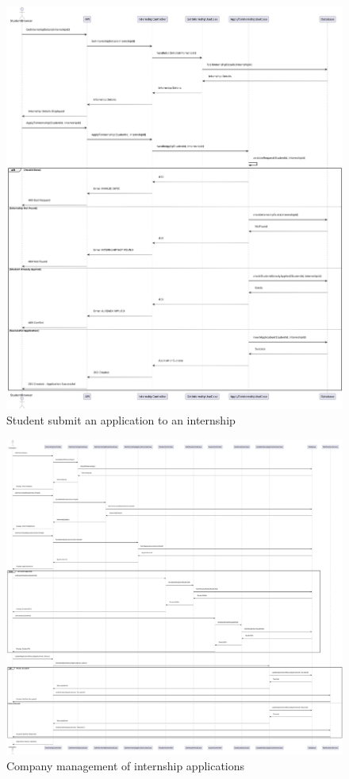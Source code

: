 \newpage

\begin{figure}[ht!]
    \centering
    \includegraphics[scale=0.28]{Images/ImagesSequenceDiagram/StudentSubmitApplication.png}
    \caption{Student submit an application to an internship}
\end{figure}

\newpage

\begin{figure}[ht!]
    \centering
    \includegraphics[scale=0.15]{Images/ImagesSequenceDiagram/CompanyManagesIncomeApplications.png}
    \caption{Company management of internship applications}
\end{figure}

